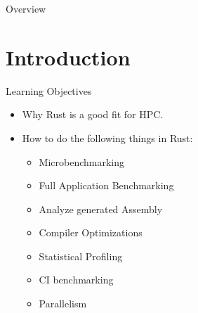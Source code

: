 \documentclass[compress,aspectratio=169]{beamer}
\begin{document}
\begin{frame}[plain]
	\titlepage
\end{frame}

\begin{frame}{Overview}
\tableofcontents
\end{frame}

\section{Introduction}

\begin{frame}{Learning Objectives}
  \begin{itemize}
    \item Why Rust is a good fit for HPC.
    \item How to do the following things in Rust:
      \begin{itemize}
        \item Microbenchmarking
        \item Full Application Benchmarking
        \item Analyze generated Assembly
        \item Compiler Optimizations
        \item Statistical Profiling
        \item CI benchmarking
        \item Parallelism
      \end{itemize}
  \end{itemize}
\end{frame}
\end{document}
